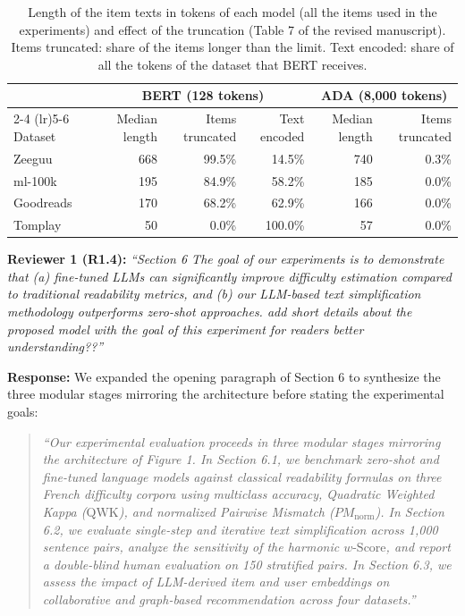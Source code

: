 \documentclass[11pt,a4paper]{article}
\newcommand{\mm}[1]{#1}
\begin{document}
\begin{table}[!htbp]
\centering
\scriptsize
\color{maximecolor}
\caption{\mm{Length of the item texts in tokens of each model (all the items used in the experiments) and effect of the truncation (Table 7 of the revised manuscript). Items truncated: share of the items longer than the limit. Text encoded: share of all the tokens of the dataset that BERT receives.}}
\label{tab:rebuttal_token_lengths}
\begin{tabular}{lrrrrr}
\toprule
 & \multicolumn{3}{c}{BERT (128 tokens)} & \multicolumn{2}{c}{ADA (8,000 tokens)} \\
\cmidrule(lr){2-4} \cmidrule(lr){5-6}
Dataset & Median length & Items truncated & Text encoded & Median length & Items truncated \\
\midrule
Zeeguu & 668 & 99.5\% & 14.5\% & 740 & 0.3\% \\
ml-100k & 195 & 84.9\% & 58.2\% & 185 & 0.0\% \\
Goodreads & 170 & 68.2\% & 62.9\% & 166 & 0.0\% \\
Tomplay & 50 & 0.0\% & 100.0\% & 57 & 0.0\% \\
\bottomrule
\end{tabular}
\end{table}

\begin{reviewbox}
\textbf{Reviewer 1 (R1.4):} \textit{``Section 6 The goal of our experiments is to demonstrate that (a) fine-tuned LLMs can significantly improve difficulty estimation compared to traditional readability metrics, and (b) our LLM-based text simplification methodology outperforms zero-shot approaches. add short details about the proposed model with the goal of this experiment for readers better understanding??''}
\end{reviewbox}

\noindent\textbf{Response:}
We expanded the opening paragraph of Section 6 to synthesize the three modular stages mirroring the architecture before stating the experimental goals:
\begin{quote}
\textit{``Our experimental evaluation proceeds in three modular stages mirroring the architecture of Figure 1. In Section 6.1, we benchmark zero-shot and fine-tuned language models against classical readability formulas on three French difficulty corpora using multiclass accuracy, Quadratic Weighted Kappa ($\text{QWK}$), and normalized Pairwise Mismatch ($PM_{\text{norm}}$). In Section 6.2, we evaluate single-step and iterative text simplification across 1,000 sentence pairs, analyze the sensitivity of the harmonic $w\text{-Score}$, and report a double-blind human evaluation on 150 stratified pairs. In Section 6.3, we assess the impact of LLM-derived item and user embeddings on collaborative and graph-based recommendation across four datasets.''}
\end{quote}
\end{document}
